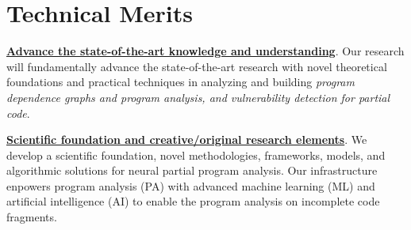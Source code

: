 \section{Technical Merits}

\noindent \underline{{\bf Advance the state-of-the-art knowledge and
    understanding}}. Our research will fundamentally advance
the state-of-the-art research with novel theoretical foundations and
practical techniques in analyzing and building {\em program dependence
  graphs and program analysis, and vulnerability detection for partial
  code}.

\noindent \underline{{\bf Scientific foundation and creative/original
    research elements}}. We develop a scientific foundation, novel
methodologies, frameworks, models, and algorithmic solutions for
neural partial program analysis. Our infrastructure enpowers program
  analysis (PA) with advanced machine learning (ML) and artificial
  intelligence (AI) to enable the program analysis on incomplete code
  fragments.
